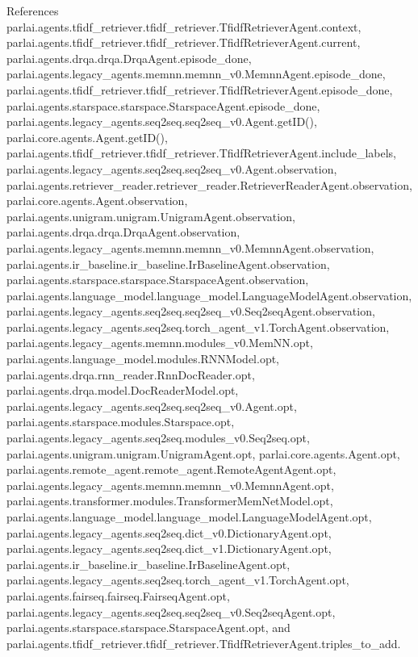 References parlai.\+agents.\+tfidf\+\_\+retriever.\+tfidf\+\_\+retriever.\+Tfidf\+Retriever\+Agent.\+context, parlai.\+agents.\+tfidf\+\_\+retriever.\+tfidf\+\_\+retriever.\+Tfidf\+Retriever\+Agent.\+current, parlai.\+agents.\+drqa.\+drqa.\+Drqa\+Agent.\+episode\+\_\+done, parlai.\+agents.\+legacy\+\_\+agents.\+memnn.\+memnn\+\_\+v0.\+Memnn\+Agent.\+episode\+\_\+done, parlai.\+agents.\+tfidf\+\_\+retriever.\+tfidf\+\_\+retriever.\+Tfidf\+Retriever\+Agent.\+episode\+\_\+done, parlai.\+agents.\+starspace.\+starspace.\+Starspace\+Agent.\+episode\+\_\+done, parlai.\+agents.\+legacy\+\_\+agents.\+seq2seq.\+seq2seq\+\_\+v0.\+Agent.\+get\+I\+D(), parlai.\+core.\+agents.\+Agent.\+get\+I\+D(), parlai.\+agents.\+tfidf\+\_\+retriever.\+tfidf\+\_\+retriever.\+Tfidf\+Retriever\+Agent.\+include\+\_\+labels, parlai.\+agents.\+legacy\+\_\+agents.\+seq2seq.\+seq2seq\+\_\+v0.\+Agent.\+observation, parlai.\+agents.\+retriever\+\_\+reader.\+retriever\+\_\+reader.\+Retriever\+Reader\+Agent.\+observation, parlai.\+core.\+agents.\+Agent.\+observation, parlai.\+agents.\+unigram.\+unigram.\+Unigram\+Agent.\+observation, parlai.\+agents.\+drqa.\+drqa.\+Drqa\+Agent.\+observation, parlai.\+agents.\+legacy\+\_\+agents.\+memnn.\+memnn\+\_\+v0.\+Memnn\+Agent.\+observation, parlai.\+agents.\+ir\+\_\+baseline.\+ir\+\_\+baseline.\+Ir\+Baseline\+Agent.\+observation, parlai.\+agents.\+starspace.\+starspace.\+Starspace\+Agent.\+observation, parlai.\+agents.\+language\+\_\+model.\+language\+\_\+model.\+Language\+Model\+Agent.\+observation, parlai.\+agents.\+legacy\+\_\+agents.\+seq2seq.\+seq2seq\+\_\+v0.\+Seq2seq\+Agent.\+observation, parlai.\+agents.\+legacy\+\_\+agents.\+seq2seq.\+torch\+\_\+agent\+\_\+v1.\+Torch\+Agent.\+observation, parlai.\+agents.\+legacy\+\_\+agents.\+memnn.\+modules\+\_\+v0.\+Mem\+N\+N.\+opt, parlai.\+agents.\+language\+\_\+model.\+modules.\+R\+N\+N\+Model.\+opt, parlai.\+agents.\+drqa.\+rnn\+\_\+reader.\+Rnn\+Doc\+Reader.\+opt, parlai.\+agents.\+drqa.\+model.\+Doc\+Reader\+Model.\+opt, parlai.\+agents.\+legacy\+\_\+agents.\+seq2seq.\+seq2seq\+\_\+v0.\+Agent.\+opt, parlai.\+agents.\+starspace.\+modules.\+Starspace.\+opt, parlai.\+agents.\+legacy\+\_\+agents.\+seq2seq.\+modules\+\_\+v0.\+Seq2seq.\+opt, parlai.\+agents.\+unigram.\+unigram.\+Unigram\+Agent.\+opt, parlai.\+core.\+agents.\+Agent.\+opt, parlai.\+agents.\+remote\+\_\+agent.\+remote\+\_\+agent.\+Remote\+Agent\+Agent.\+opt, parlai.\+agents.\+legacy\+\_\+agents.\+memnn.\+memnn\+\_\+v0.\+Memnn\+Agent.\+opt, parlai.\+agents.\+transformer.\+modules.\+Transformer\+Mem\+Net\+Model.\+opt, parlai.\+agents.\+language\+\_\+model.\+language\+\_\+model.\+Language\+Model\+Agent.\+opt, parlai.\+agents.\+legacy\+\_\+agents.\+seq2seq.\+dict\+\_\+v0.\+Dictionary\+Agent.\+opt, parlai.\+agents.\+legacy\+\_\+agents.\+seq2seq.\+dict\+\_\+v1.\+Dictionary\+Agent.\+opt, parlai.\+agents.\+ir\+\_\+baseline.\+ir\+\_\+baseline.\+Ir\+Baseline\+Agent.\+opt, parlai.\+agents.\+legacy\+\_\+agents.\+seq2seq.\+torch\+\_\+agent\+\_\+v1.\+Torch\+Agent.\+opt, parlai.\+agents.\+fairseq.\+fairseq.\+Fairseq\+Agent.\+opt, parlai.\+agents.\+legacy\+\_\+agents.\+seq2seq.\+seq2seq\+\_\+v0.\+Seq2seq\+Agent.\+opt, parlai.\+agents.\+starspace.\+starspace.\+Starspace\+Agent.\+opt, and parlai.\+agents.\+tfidf\+\_\+retriever.\+tfidf\+\_\+retriever.\+Tfidf\+Retriever\+Agent.\+triples\+\_\+to\+\_\+add.
